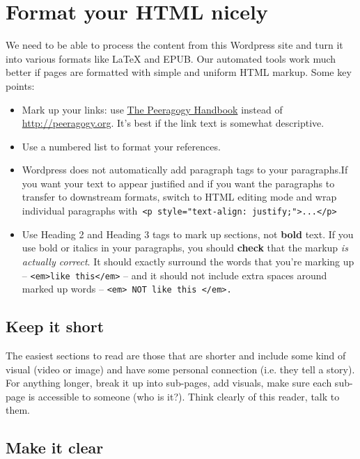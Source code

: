 \section*{Format your HTML nicely}

We need to be able to process the content from this Wordpress site and
turn it into various formats like LaTeX and EPUB. Our automated tools
work much better if pages are formatted with simple and uniform HTML
markup. Some key points:

\begin{itemize}
\item
  Mark up your links: use \href{http://peeragogy.org}{The Peeragogy
  Handbook} instead of
  \href{http://peeragogy.org}{http://peeragogy.org}. It's best if the
  link text is somewhat descriptive.
\item
  Use a numbered list to format your references.
\item
  Wordpress does not automatically add paragraph tags to your
  paragraphs.If you want your text to appear justified and if you want
  the paragraphs to transfer to downstream formats, switch to HTML
  editing mode and wrap individual paragraphs
  with\texttt{ \textless{}p style="text-align: justify;"\textgreater{}...\textless{}/p\textgreater{}}
\item
  Use Heading 2 and Heading 3 tags to mark up sections, not
  \textbf{bold} text. If you use bold or italics in your paragraphs, you
  should \textbf{check} that the markup \emph{is actually correct}. It
  should exactly surround the words that you're marking up --
  \texttt{\textless{}em\textgreater{}like this\textless{}/em\textgreater{}}
  -- and it should not include extra spaces around marked up words --
  \texttt{\textless{}em\textgreater{} NOT like this \textless{}/em\textgreater{}.}
\end{itemize}
\subsection{Keep it short}

The easiest sections to read are those that are shorter and include some
kind of visual (video or image) and have some personal connection (i.e.
they tell a story). For anything longer, break it up into sub-pages, add
visuals, make sure each sub-page is accessible to someone (who is it?).
Think clearly of this reader, talk to them.

\subsection{Make it clear}

